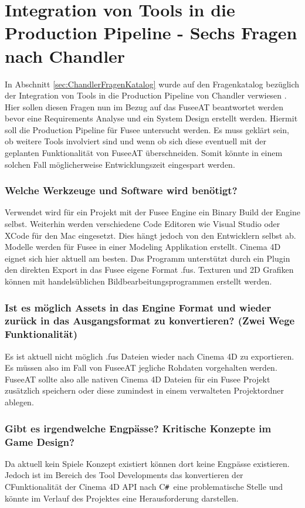 \documentclass[pagesize, paper=a4, fontsize=12pt, titlepage=true, headings=small, headnosepline, abstractoff, liststotoc, nochapterprefix, plainheadsepline, twoside]{scrreprt}
\newcommand{\CSS}{C\texttt{\# }}
\newcommand{\CPP}{C\nolinebreak\hspace{-.05em}\raisebox{.4ex}{\tiny\bf +}\nolinebreak\hspace{-.10em}\raisebox{.4ex}{\tiny\bf +}}
\begin{document}
\section{Integration von Tools in die Production Pipeline - Sechs Fragen nach Chandler }\label{sec:ChandlerFragenAntwort}
In Abschnitt \ref{sec:ChandlerFragenKatalog} wurde auf den Fragenkatalog bezüglich der Integration von Tools in die Production Pipeline von Chandler verwiesen \parencite[S. 223-224]{Chandler2006}. Hier sollen diesen Fragen nun im Bezug auf das FuseeAT beantwortet werden bevor eine Requirements Analyse und ein System Design erstellt werden. Hiermit soll die Production Pipeline für Fusee untersucht werden. Es muss geklärt sein, ob weitere Tools involviert sind und wenn ob sich diese eventuell mit der geplanten Funktionalität von FuseeAT überschneiden. Somit könnte in einem solchen Fall möglicherweise Entwicklungszeit eingespart werden.

\subsubsection{Welche Werkzeuge und Software wird benötigt?}
Verwendet wird für ein Projekt mit der Fusee Engine ein Binary Build der Engine selbst. Weiterhin werden verschiedene Code Editoren wie Visual Studio oder XCode für den Mac eingesetzt. Dies hängt jedoch von den Entwicklern selbst ab. Modelle werden für Fusee in einer Modeling Applikation erstellt. Cinema 4D eignet sich hier aktuell am besten. Das Programm unterstützt durch ein Plugin den direkten Export in das Fusee eigene Format .fus. Texturen und 2D Grafiken können mit handelsüblichen Bildbearbeitungsprogrammen erstellt werden.

\subsubsection{Ist es möglich Assets in das Engine Format und wieder zurück in das Ausgangsformat zu konvertieren? (Zwei Wege Funktionalität)}
Es ist aktuell nicht möglich .fus Dateien wieder nach Cinema 4D zu exportieren. Es müssen also im Fall von FuseeAT jegliche Rohdaten vorgehalten werden. FuseeAT sollte also alle nativen Cinema 4D Dateien für ein Fusee Projekt zusätzlich speichern oder diese zumindest in einem verwalteten Projektordner ablegen.

\subsubsection{Gibt es irgendwelche Engpässe? Kritische Konzepte im Game Design?}
Da aktuell kein Spiele Konzept existiert können dort keine Engpässe existieren. Jedoch ist im Bereich des Tool Developments das konvertieren der \CPP Funktionalität der Cinema 4D API nach \CSS eine problematische Stelle und könnte im Verlauf des Projektes eine Herausforderung darstellen.
\end{document}
